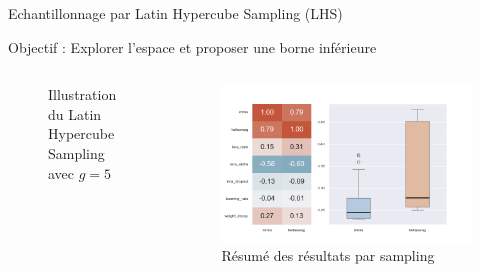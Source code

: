 \begin{frame}{Echantillonnage par Latin Hypercube Sampling (LHS)}
    \begin{block}{}
        Objectif : Explorer l'espace et proposer une borne inférieure
        
    \end{block}\vspace*{-10pt}
    \begin{columns}
        \begin{column}{0.35\textwidth} 

            \begin{figure}
                \centering
                
                \caption{Illustration du Latin Hypercube Sampling avec $g=5$}
            \end{figure} 
     
            \end{column}
                 
            \begin{column}{0.55\textwidth}
                \begin{figure}
                    \centering
                    \includegraphics[width = \textwidth]{assets/imgs/plots/sampling/lhs.png}
                    \vspace*{-20pt}\caption{Résumé des résultats par sampling}
                \end{figure} 
            \end{column}
                 
    \end{columns}
\end{frame}

